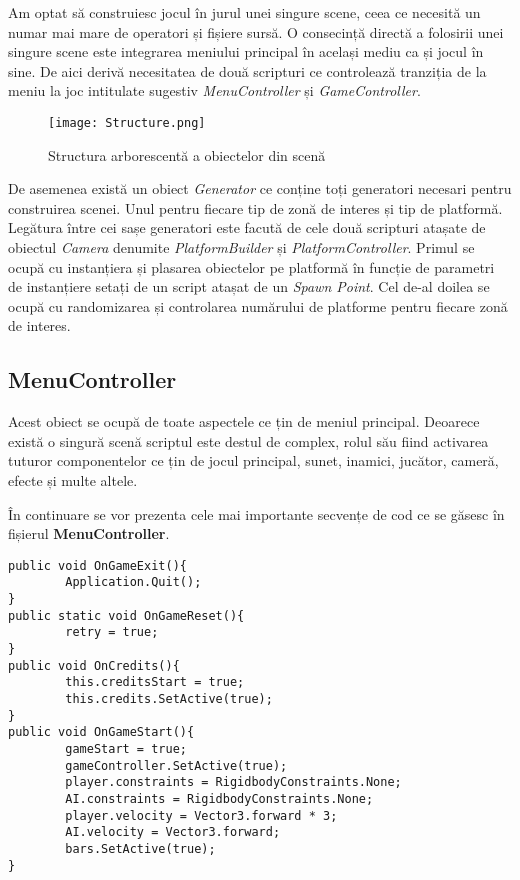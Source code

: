 Am optat să construiesc jocul în jurul unei singure scene, ceea ce necesită un numar mai mare de operatori și fișiere sursă. O consecință directă a folosirii unei singure scene este integrarea meniului principal în același mediu ca și jocul în sine. De aici derivă necesitatea de două scripturi ce controlează tranziția de la meniu la joc intitulate sugestiv \textit{MenuController} și \textit{GameController}.\par


\begin{figure}[H]
\centering
\texttt{[image: Structure.png]} \par
\caption{Structura arborescentă a obiectelor din scenă}
\end{figure}

De asemenea există un obiect \textit{Generator} ce conține toți generatori necesari pentru construirea scenei. Unul pentru fiecare tip de zonă de interes și tip de platformă. Legătura între cei sașe generatori este facută de cele două scripturi atașate de obiectul \textit{Camera} denumite \textit{PlatformBuilder} și \textit{PlatformController}. Primul se ocupă cu instanțiera și plasarea obiectelor pe platformă în funcție de parametri de instanțiere setați de un script atașat de un \textit{Spawn Point}. Cel de-al doilea se ocupă cu randomizarea și controlarea numărului de platforme pentru fiecare zonă de interes.\par
\par

\subsection{MenuController}

Acest obiect se ocupă de toate aspectele ce țin de meniul principal. Deoarece există o singură scenă scriptul este destul de complex, rolul său fiind activarea tuturor componentelor ce țin de jocul principal, sunet, inamici, jucător, cameră, efecte și multe altele.\par

În continuare se vor prezenta cele mai importante secvențe de cod ce se găsesc în fișierul \textbf{MenuController}.\par

\begin{lstlisting}[caption=Funcțiile din MenuController]
public void OnGameExit(){
        Application.Quit();
}
public static void OnGameReset(){
        retry = true;
}
public void OnCredits(){
        this.creditsStart = true;
        this.credits.SetActive(true);
}
public void OnGameStart(){
        gameStart = true;
        gameController.SetActive(true);
        player.constraints = RigidbodyConstraints.None;
        AI.constraints = RigidbodyConstraints.None;
        player.velocity = Vector3.forward * 3;
        AI.velocity = Vector3.forward;
        bars.SetActive(true);
}
\end{lstlisting}

